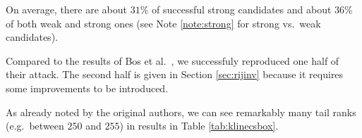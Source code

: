 	On average, there are about $31\%$ of successful strong candidates and about $36\%$ of both weak and strong ones (see Note \ref{note:strong} for strong vs.\ weak candidates).
	
	Compared to the results of Bos et al.\ \cite{bos2015differential}, we successfuly reproduced one half of their attack. The second half is given in Section \ref{sec:rijinv} because it requires some improvements to be introduced.
	
	\begin{note}
	\label{note:tailrank}
		As already noted by the original authors, we can see remarkably many tail ranks (e.g.\ between $250$ and $255$) in results in Table \ref{tab:klinecsbox}.
	\end{note}




